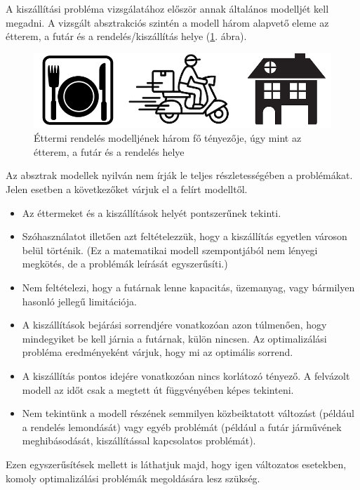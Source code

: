 
A kiszállítási probléma vizsgálatához először annak általános modelljét kell megadni.
A vizsgált absztrakciós szintén a modell három alapvető eleme az étterem, a futár és a rendelés/kiszállítás helye (\ref{fig:generalModel}. ábra).

\begin{figure}[h!]
	\centering
	\includegraphics[scale=0.5]{images/complexModel.png}
	\caption{Éttermi rendelés modelljének három fő tényezője, úgy mint az étterem, a futár és a rendelés helye}
	\label{fig:generalModel}
\end{figure}

Az absztrak modellek nyilván nem írják le teljes részletességében a problémákat.
Jelen esetben a következőket várjuk el a felírt modelltől.
\begin{itemize}
	\item Az éttermeket és a kiszállítások helyét pontszerűnek tekinti.
	\item Szóhasználatot illetően azt feltételezzük, hogy a kiszállítás egyetlen városon belül történik. (Ez a matematikai modell szempontjából nem lényegi megkötés, de a problémák leírását egyszerűsíti.)
	\item Nem feltételezi, hogy a futárnak lenne kapacitás, üzemanyag, vagy bármilyen hasonló jellegű limitációja.
	\item A kiszállítások bejárási sorrendjére vonatkozóan azon túlmenően, hogy mindegyiket be kell járnia a futárnak, külön nincsen. Az optimalizálási probléma eredményeként várjuk, hogy mi az optimális sorrend.
	\item A kiszállítás pontos idejére vonatkozóan nincs korlátozó tényező. A felvázolt modell az időt csak a megtett út függvényében képes tekinteni.
	\item Nem tekintünk a modell részének semmilyen közbeiktatott változást (például a rendelés lemondását) vagy egyéb problémát (például a futár járművének meghibásodását, kiszállítással kapcsolatos problémát).
\end{itemize}
Ezen egyszerűsítések mellett is láthatjuk majd, hogy igen változatos esetekben, komoly optimalizálási problémák megoldására lesz szükség.

